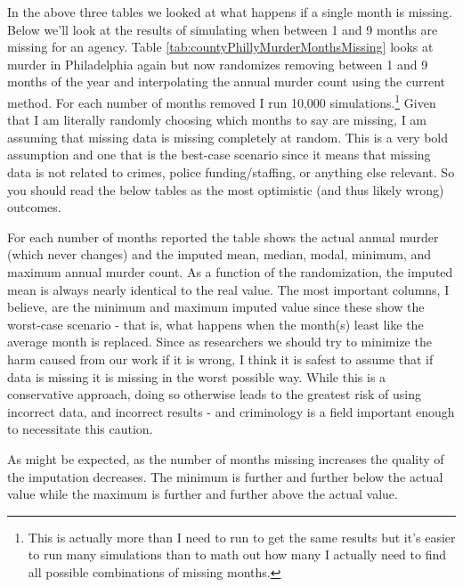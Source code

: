 \documentclass[
  12pt,
  openany]{book}
\begin{document}
In the above three tables we looked at what happens if a single month is missing. Below we'll look at the results of simulating when between 1 and 9 months are missing for an agency. Table \ref{tab:countyPhillyMurderMonthsMissing} looks at murder in Philadelphia again but now randomizes removing between 1 and 9 months of the year and interpolating the annual murder count using the current method. For each number of months removed I run 10,000 simulations.\footnote{This is actually more than I need to run to get the same results but it's easier to run many simulations than to math out how many I actually need to find all possible combinations of missing months.} Given that I am literally randomly choosing which months to say are missing, I am assuming that missing data is missing completely at random. This is a very bold assumption and one that is the best-case scenario since it means that missing data is not related to crimes, police funding/staffing, or anything else relevant. So you should read the below tables as the most optimistic (and thus likely wrong) outcomes.

For each number of months reported the table shows the actual annual murder (which never changes) and the imputed mean, median, modal, minimum, and maximum annual murder count. As a function of the randomization, the imputed mean is always nearly identical to the real value. The most important columns, I believe, are the minimum and maximum imputed value since these show the worst-case scenario - that is, what happens when the month(s) least like the average month is replaced. Since as researchers we should try to minimize the harm caused from our work if it is wrong, I think it is safest to assume that if data is missing it is missing in the worst possible way. While this is a conservative approach, doing so otherwise leads to the greatest risk of using incorrect data, and incorrect results - and criminology is a field important enough to necessitate this caution.

As might be expected, as the number of months missing increases the quality of the imputation decreases. The minimum is further and further below the actual value while the maximum is further and further above the actual value.
\end{document}
